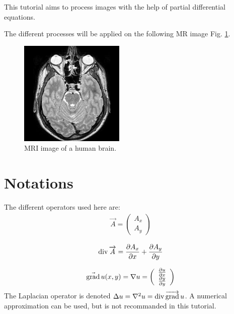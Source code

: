 \def\difficulty{1}

\begin{note}This tutorial aims to process images with the help of partial differential equations.\end{note}

\noindent The different processes will be applied on the following MR image Fig. \ref{fig:pde:enonce:irm}.

\begin{figure}[htbp]
\centering
\includegraphics[width=5cm]{cerveau.jpg}
\caption{MRI image of a human brain.}
\label{fig:pde:enonce:irm}
\end{figure}

\section*{Notations}
The different operators used here are:
\begin{eqnarray}
 \vec{A} = \left( \begin{array}{c}
                   A_x \\
                   A_y 
                  \end{array}
\right)
\end{eqnarray}

\begin{eqnarray}\operatorname*{div} \overrightarrow{A} = \frac{\partial A_x}{\partial x} + \frac{\partial A_y}{\partial y}
\end{eqnarray}


\begin{eqnarray}
\vec{\operatorname*{grad}}\,u(x,y) =\nabla u= \left( \begin{array}{c}
                       \frac{\partial u}{\partial x} \\
                       \frac{\partial y}{\partial y}
                      \end{array}
\right)
\end{eqnarray}
The Laplacian operator is denoted $\Delta u=\nabla^2 u= \operatorname*{div} \overrightarrow{\operatorname*{grad}}\,u$. A numerical approximation can be used, but is not recommanded in this tutorial.

